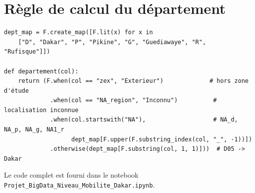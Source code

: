 \documentclass[12pt,a4paper]{report}
\newcommand{\1}{\mathbf{1}}
\begin{document}
\chapter{Règle de calcul du département}
\begin{lstlisting}[caption={Département à partir du code de strate, codes spéciaux inclus},label={lst:dept}]
dept_map = F.create_map([F.lit(x) for x in
    ["D", "Dakar", "P", "Pikine", "G", "Guediawaye", "R", "Rufisque"]])

def departement(col):
    return (F.when(col == "zex", "Exterieur")             # hors zone d'étude
             .when(col == "NA_region", "Inconnu")          # localisation inconnue
             .when(col.startswith("NA"),                   # NA_d, NA_p, NA_g, NA1_r
                   dept_map[F.upper(F.substring_index(col, "_", -1))])
             .otherwise(dept_map[F.substring(col, 1, 1)]))  # D05 -> Dakar
\end{lstlisting}

Le code complet est fourni dans le notebook {\small\nolinkurl{Projet_BigData_Niveau_Mobilite_Dakar.ipynb}}.
\end{document}
